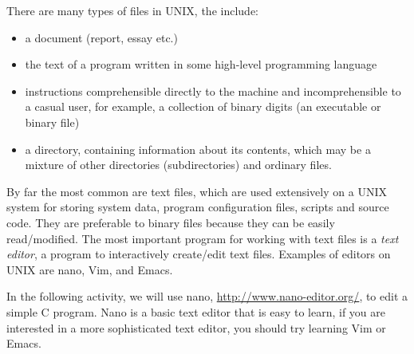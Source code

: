 There are many types of files in UNIX, the include:
\begin{itemize}
\item a document (report, essay etc.)
\item the text of a program written in some high-level programming language
\item instructions comprehensible directly to the machine and incomprehensible 
to a casual user, for example, a collection of binary digits (an executable or 
binary file)
\item a directory, containing information about its contents, which may be a 
mixture of other directories (subdirectories) and ordinary files.
\end{itemize}

By far the most common are text files, which are used extensively on a UNIX
system for storing system data, program configuration files, scripts and source
code. They are preferable to binary files because they can be easily
read/modified.  The most important program for working with text files is a
\emph{text editor}, a program to interactively create/edit text files.  Examples
of editors on UNIX are nano, Vim, and Emacs.

\begin{frame}
\end{frame}

In the following activity, we will use nano, \url{http://www.nano-editor.org/},
to edit a simple C program. Nano is a basic text editor that is easy to learn,
if you are interested in a more sophisticated text editor, you should try
learning Vim or Emacs.  

